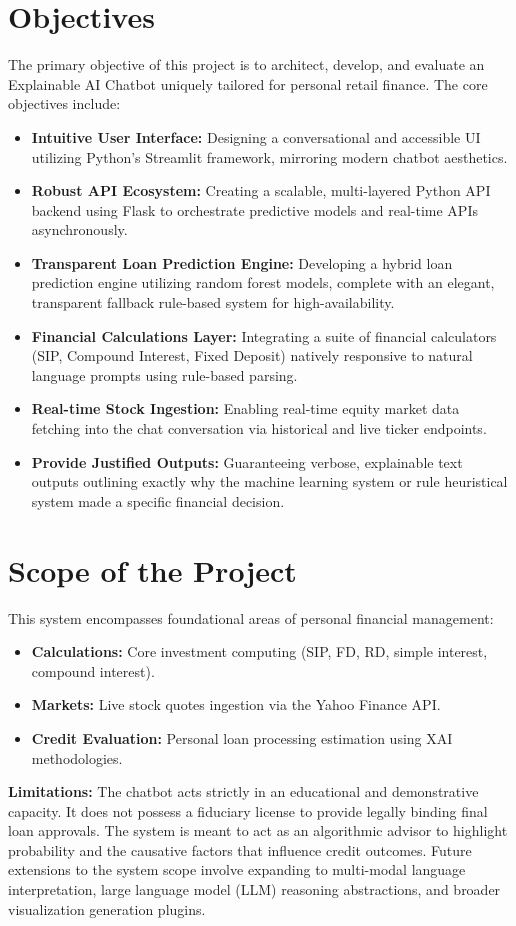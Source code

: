 \documentclass[12pt,a4paper]{report}
\begin{document}
\section{Objectives}
The primary objective of this project is to architect, develop, and evaluate an Explainable AI Chatbot uniquely tailored for personal retail finance. The core objectives include:
\begin{itemize}
    \item \textbf{Intuitive User Interface:} Designing a conversational and accessible UI utilizing Python's Streamlit framework, mirroring modern chatbot aesthetics.
    \item \textbf{Robust API Ecosystem:} Creating a scalable, multi-layered Python API backend using Flask to orchestrate predictive models and real-time APIs asynchronously.
    \item \textbf{Transparent Loan Prediction Engine:} Developing a hybrid loan prediction engine utilizing random forest models, complete with an elegant, transparent fallback rule-based system for high-availability.
    \item \textbf{Financial Calculations Layer:} Integrating a suite of financial calculators (SIP, Compound Interest, Fixed Deposit) natively responsive to natural language prompts using rule-based parsing.
    \item \textbf{Real-time Stock Ingestion:} Enabling real-time equity market data fetching into the chat conversation via historical and live ticker endpoints.
    \item \textbf{Provide Justified Outputs:} Guaranteeing verbose, explainable text outputs outlining exactly why the machine learning system or rule heuristical system made a specific financial decision.
\end{itemize}

\section{Scope of the Project}
This system encompasses foundational areas of personal financial management:
\begin{itemize}
    \item \textbf{Calculations:} Core investment computing (SIP, FD, RD, simple interest, compound interest).
    \item \textbf{Markets:} Live stock quotes ingestion via the Yahoo Finance API.
    \item \textbf{Credit Evaluation:} Personal loan processing estimation using XAI methodologies.
\end{itemize}
\textbf{Limitations:} The chatbot acts strictly in an educational and demonstrative capacity. It does not possess a fiduciary license to provide legally binding final loan approvals. The system is meant to act as an algorithmic advisor to highlight probability and the causative factors that influence credit outcomes. Future extensions to the system scope involve expanding to multi-modal language interpretation, large language model (LLM) reasoning abstractions, and broader visualization generation plugins.
\end{document}
